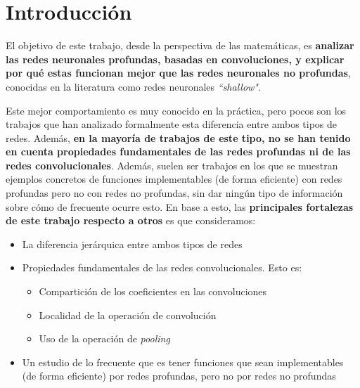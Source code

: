 
\chapter{Introducción}\label{ch:introduccion}

El objetivo de este trabajo, desde la perspectiva de las matemáticas, es \textbf{analizar las redes neuronales profundas, basadas en convoluciones, y explicar por qué estas funcionan mejor que las redes neuronales no profundas}, conocidas en la literatura como redes neuronales \textit{``shallow"}.

%
Este mejor comportamiento es muy conocido en la práctica, pero pocos son los trabajos que han analizado formalmente esta diferencia entre ambos tipos de redes. Además, \textbf{en la mayoría de trabajos de este tipo, no se han tenido en cuenta propiedades fundamentales de las redes profundas ni de las redes convolucionales}. Además, suelen ser trabajos en los que se muestran ejemplos concretos de funciones implementables (de forma eficiente) con redes profundas pero no con redes no profundas, sin dar ningún tipo de información sobre cómo de frecuente ocurre esto. En base a esto, las \textbf{principales fortalezas de este trabajo respecto a otros} es que consideramos:

\begin{itemize}
    \item La diferencia jerárquica entre ambos tipos de redes
    \item Propiedades fundamentales de las redes convolucionales. Esto es:
        \begin{itemize}
            \item Compartición de los coeficientes en las convoluciones
            \item Localidad de la operación de convolución
            \item Uso de la operación de \textit{pooling}
        \end{itemize}
    \item Un estudio de lo frecuente que es tener funciones que sean implementables (de forma eficiente) por redes profundas, pero no por redes no profundas
\end{itemize}


